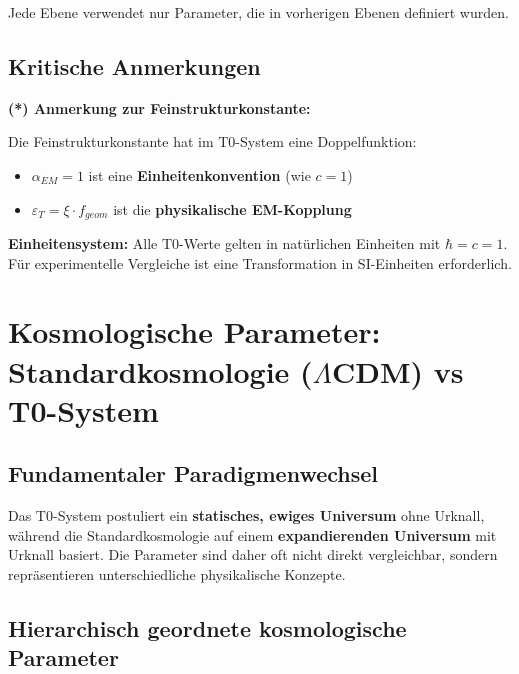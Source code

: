 \documentclass[12pt,a4paper]{article}
\theoremstyle{definition}
\begin{document}
Jede Ebene verwendet nur Parameter, die in vorherigen Ebenen definiert wurden.

\subsection{Kritische Anmerkungen}
\label{subsec:critical_notes}

\textbf{(*) Anmerkung zur Feinstrukturkonstante:}

Die Feinstrukturkonstante hat im T0-System eine Doppelfunktion:
\begin{itemize}
	\item $\alpha_{EM} = 1$ ist eine \textbf{Einheitenkonvention} (wie $c = 1$)
	\item $\varepsilon_T = \xi \cdot f_{geom}$ ist die \textbf{physikalische EM-Kopplung}
\end{itemize}

\textbf{Einheitensystem:}
Alle T0-Werte gelten in natürlichen Einheiten mit $\hbar = c = 1$. Für experimentelle Vergleiche ist eine Transformation in SI-Einheiten erforderlich.

\section{Kosmologische Parameter: Standardkosmologie ($\Lambda$CDM) vs T0-System}
\label{sec:cosmic_t0_mapping}

\subsection{Fundamentaler Paradigmenwechsel}
\label{subsec:paradigm_shift}

\begin{tcolorbox}[colback=red!5!white,colframe=red!75!black,title=Warnung: Fundamentale Unterschiede]
	Das T0-System postuliert ein \textbf{statisches, ewiges Universum} ohne Urknall, während die Standardkosmologie auf einem \textbf{expandierenden Universum} mit Urknall basiert. Die Parameter sind daher oft nicht direkt vergleichbar, sondern repräsentieren unterschiedliche physikalische Konzepte.
\end{tcolorbox}

\subsection{Hierarchisch geordnete kosmologische Parameter}
\label{subsec:cosmic_hierarchical_mapping}
\end{document}
